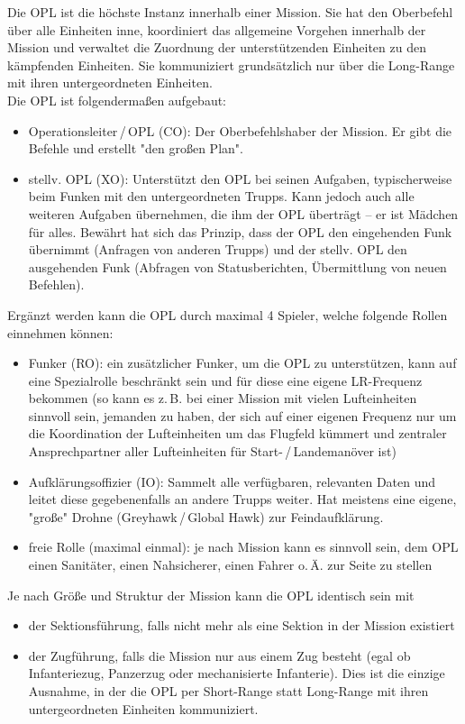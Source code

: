 Die \ac{OPL} ist die höchste Instanz innerhalb einer Mission. Sie hat den Oberbefehl über alle Einheiten inne, koordiniert das allgemeine Vorgehen innerhalb der Mission und verwaltet die Zuordnung der unterstützenden Einheiten zu den kämpfenden Einheiten. Sie kommuniziert grundsätzlich nur über die Long-Range mit ihren untergeordneten Einheiten.\\
Die \ac{OPL} ist folgendermaßen aufgebaut:
\begin{itemize}
	\item Operationsleiter\,/\,\acs{OPL} (\acf{CO}): Der Oberbefehlshaber der Mission. Er gibt die Befehle und erstellt "den großen Plan".
	\item stellv. \ac{OPL} (\acf{XO}): Unterstützt den \ac{OPL} bei seinen Aufgaben, typischerweise beim Funken mit den untergeordneten Trupps. Kann jedoch auch alle weiteren Aufgaben übernehmen, die ihm der \ac{OPL} überträgt -- er ist Mädchen für alles. Bewährt hat sich das Prinzip, dass der \ac{OPL} den eingehenden Funk übernimmt (Anfragen von anderen Trupps) und der stellv. \ac{OPL} den ausgehenden Funk (Abfragen von Statusberichten, Übermittlung von neuen Befehlen).
\end{itemize}
Ergänzt werden kann die \ac{OPL} durch maximal 4 Spieler, welche folgende Rollen einnehmen können:
\begin{itemize}
	\item Funker (\acf{RO}): ein zusätzlicher Funker, um die \ac{OPL} zu unterstützen, kann auf eine Spezialrolle beschränkt sein und für diese eine eigene LR-Frequenz bekommen (so kann es z.\,B. bei einer Mission mit vielen Lufteinheiten sinnvoll sein, jemanden zu haben, der sich auf einer eigenen Frequenz nur um die Koordination der Lufteinheiten um das Flugfeld kümmert und zentraler Ansprechpartner aller Lufteinheiten für Start-\,/\,Landemanöver ist)
	\item Aufklärungsoffizier (\acf{IO}): Sammelt alle verfügbaren, relevanten Daten und leitet diese gegebenenfalls an andere Trupps weiter. Hat meistens eine eigene, "große" Drohne (Greyhawk\,/\,Global Hawk) zur Feindaufklärung.
	\item freie Rolle (maximal einmal): je nach Mission kann es sinnvoll sein, dem \ac{OPL} einen Sanitäter, einen Nahsicherer, einen Fahrer o.\,Ä. zur Seite zu stellen
\end{itemize}
Je nach Größe und Struktur der Mission kann die \ac{OPL} identisch sein mit
\begin{itemize}
	\item der Sektionsführung, falls nicht mehr als eine Sektion in der Mission existiert
	\item der Zugführung, falls die Mission nur aus einem Zug besteht (egal ob Infanteriezug, Panzerzug oder mechanisierte Infanterie). Dies ist die einzige Ausnahme, in der die \ac{OPL} per Short-Range statt Long-Range mit ihren untergeordneten Einheiten kommuniziert.
\end{itemize}